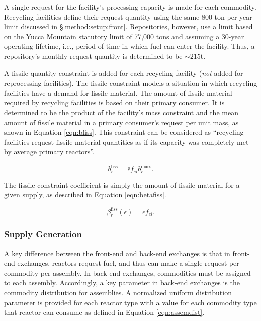 A single request for the facility's processing capacity is made for each
commodity. Recycling facilities define their request quantity using the same 800
ton per year limit discussed in \S \ref{method:setup:front}. Repositories,
however, use a limit based on the Yucca Mountain statutory limit of 77,000 tons
and assuming a 30-year operating lifetime, i.e., period of time in which fuel
can enter the facility. Thus, a repository's monthly request quantity is
determined to be $\sim 215$t.

A fissile quantity constraint is added for each recycling facility (\textit{not}
added for reprocessing facilities). The fissile constraint models a situation in
which recycling facilities have a demand for fissile material. The amount of
fissile material required by recycling facilities is based on their primary
consumer. It is determined to be the product of the facility's mass constraint
and the mean amount of fissile material in a primary consumer's request per unit
mass, as shown in Equation \ref{eqn:bfiss}. This constraint can be considered as
``recycling facilities request fissile material quantities as if its capacity
was completely met by average primary reactors''.

\begin{equation}\label{eqn:bfiss}
b^{\text{fiss}}_r = \bar{\epsilon} f_{el} b^{\text{mass}}_r.
\end{equation}

\noindent
The fissile constraint coefficient is simply the amount of fissile material for
a given supply, as described in Equation \ref{eqn:betafiss}.

\begin{equation}\label{eqn:betafiss}
\beta^{\text{fiss}}_r(\epsilon) = \epsilon f_{el}.
\end{equation}

\subsubsection{Supply Generation}

A key difference between the front-end and back-end exchanges is that in
front-end exchanges, reactors request fuel, and thus can make a single request
per commodity per assembly. In back-end exchanges, commodities must be assigned
to each assembly. Accordingly, a key parameter in back-end exchanges is the
commodity distribution for assemblies. A normalized uniform distribution
parameter is provided for each reactor type with a value for each commodity type
that reactor can consume as defined in Equation \ref{eqn:assemdist}.


